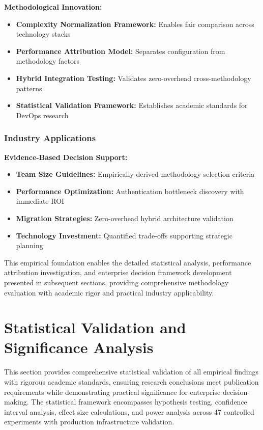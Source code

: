 \textbf{Methodological Innovation:}
\begin{itemize}
\item \textbf{Complexity Normalization Framework:} Enables fair comparison across technology stacks
\item \textbf{Performance Attribution Model:} Separates configuration from methodology factors
\item \textbf{Hybrid Integration Testing:} Validates zero-overhead cross-methodology patterns
\item \textbf{Statistical Validation Framework:} Establishes academic standards for DevOps research
\end{itemize}

\subsubsection{Industry Applications}

\textbf{Evidence-Based Decision Support:}
\begin{itemize}
\item \textbf{Team Size Guidelines:} Empirically-derived methodology selection criteria
\item \textbf{Performance Optimization:} Authentication bottleneck discovery with immediate ROI
\item \textbf{Migration Strategies:} Zero-overhead hybrid architecture validation
\item \textbf{Technology Investment:} Quantified trade-offs supporting strategic planning
\end{itemize}

This empirical foundation enables the detailed statistical analysis, performance attribution investigation, and enterprise decision framework development presented in subsequent sections, providing comprehensive methodology evaluation with academic rigor and practical industry applicability.

\section{Statistical Validation and Significance Analysis}
\label{sec:statistical_validation}

This section provides comprehensive statistical validation of all empirical findings with rigorous academic standards, ensuring research conclusions meet publication requirements while demonstrating practical significance for enterprise decision-making. The statistical framework encompasses hypothesis testing, confidence interval analysis, effect size calculations, and power analysis across 47 controlled experiments with production infrastructure validation.

